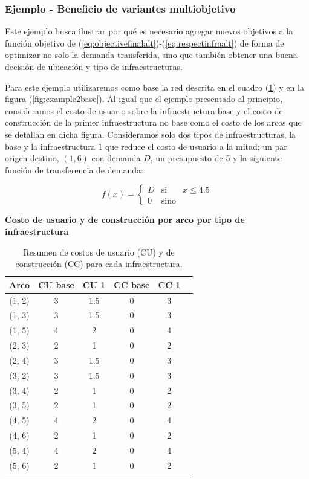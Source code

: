 \documentclass{article}
\begin{document}
  \subsubsection{Ejemplo - Beneficio de variantes multiobjetivo}

  Este ejemplo busca ilustrar por qué es necesario agregar nuevos objetivos a la función objetivo de (\ref{eq:objectivefinalalt})-(\ref{eq:respectinfraalt}) de forma de optimizar no solo la demanda transferida, sino que también obtener una buena decisión de ubicación y tipo de infraestructuras.

  Para este ejemplo utilizaremos como base la red descrita en el cuadro (\ref{table:example2arccosts}) y en la figura (\ref{fig:example2base}). Al igual que el ejemplo presentado al principio, consideramos el costo de usuario sobre la infraestructura base y el costo de construcción de la primer infraestructura no base como el costo de los arcos que se detallan en dicha figura. Consideramos solo dos tipos de infraestructuras, la base y la infraestructura 1 que reduce el costo de usuario a la mitad; un par origen-destino, $(1, 6)$ con demanda $D$, un presupuesto de 5 y la siguiente función de transferencia de demanda:

  $$
    f(x) = \left\{ \begin{array}{lcr}
            D & \mbox{si}   & x \leq 4.5 \\
            0 & \mbox{sino} &
    \end{array}
    \right.
  $$

  \begin{table}[h!]
    \centering
      \caption*{{\bf Costo de usuario y de construcción por arco por tipo de infraestructura}}
    \begin{tabular}{cccccc}
      \toprule
      Arco & CU base & CU 1 & CC base & CC 1 & \\
      \midrule
        (1, 2) & 3 & 1.5 & 0 & 3 \\
        (1, 3) & 3 & 1.5 & 0 & 3 \\
        (1, 5) & 4 & 2   & 0 & 4 \\
        (2, 3) & 2 & 1   & 0 & 2 \\
        (2, 4) & 3 & 1.5 & 0 & 3 \\
        (3, 2) & 3 & 1.5 & 0 & 3 \\
        (3, 4) & 2 & 1   & 0 & 2 \\
        (3, 5) & 2 & 1   & 0 & 2 \\
        (4, 5) & 4 & 2   & 0 & 4 \\
        (4, 6) & 2 & 1   & 0 & 2 \\
        (5, 4) & 4 & 2   & 0 & 4 \\
        (5, 6) & 2 & 1   & 0 & 2 \\
      \bottomrule
    \end{tabular}
      \caption{Resumen de costos de usuario (CU) y de construcción (CC) para cada infraestructura.}\label{table:example2arccosts}
  \end{table}
\end{document}

